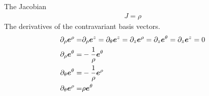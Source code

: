 %
The Jacobian
%
\begin{align*}
    J=\rho
\end{align*}
%
The derivatives of the contravariant basis vectors.
%
\begin{align*}
    \partial_\rho \boldsymbol{e}^\rho =&
    \partial_\rho \boldsymbol{e}^z =
    \partial_\theta \boldsymbol{e}^z =
    \partial_z \boldsymbol{e}^\rho =
    \partial_z \boldsymbol{e}^\theta =
    \partial_z \boldsymbol{e}^z = 0
    \\
    \partial_\rho \boldsymbol{e}^\theta =& - \frac{1}{\rho} \boldsymbol{e}^\theta
    \\
    \partial_\theta \boldsymbol{e}^\theta =& - \frac{1}{\rho} \boldsymbol{e}^\rho
    \\
    \partial_\theta \boldsymbol{e}^\rho =& \rho \boldsymbol{e}^\theta
\end{align*}

